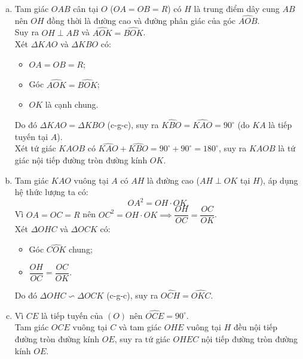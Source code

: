 \begin{bt}
{\begin{center}
\end{center}
\begin{enumerate}[a)]
	\item Tam giác $OAB$ cân tại $O$ ($OA = OB = R$) có $H$ là trung điểm dây cung $AB$ nên $OH$ đồng thời là đường cao và đường phân giác của góc $\widehat{AOB}$.\\
	Suy ra $OH \perp AB$ và $\widehat{AOK} = \widehat{BOK}$.\\
	Xét $\Delta KAO$ và $\Delta KBO$ có:
	\begin{itemize}
		\item $OA = OB = R$;
		\item Góc $\widehat{AOK} = \widehat{BOK}$;
		\item $OK$ là cạnh chung.
	\end{itemize}
	Do đó $\Delta KAO = \Delta KBO$ (c-g-c), suy ra $\widehat{KBO} = \widehat{KAO} = 90^\circ$ (do $KA$ là tiếp tuyến tại $A$).\\
	Xét tứ giác $KAOB$ có $\widehat{KAO} + \widehat{KBO} = 90^\circ + 90^\circ = 180^\circ$, suy ra $KAOB$ là tứ giác nội tiếp đường tròn đường kính $OK$.
	\item Tam giác $KAO$ vuông tại $A$ có $AH$ là đường cao ($AH \perp OK$ tại $H$), áp dụng hệ thức lượng ta có:
	$$OA^2 = OH \cdot OK.$$
	Vì $OA = OC = R$ nên $OC^2 = OH \cdot OK \implies \dfrac{OH}{OC} = \dfrac{OC}{OK}$.\\
	Xét $\Delta OHC$ và $\Delta OCK$ có:
	\begin{itemize}
		\item Góc $\widehat{COK}$ chung;
		\item $\dfrac{OH}{OC} = \dfrac{OC}{OK}$.
	\end{itemize}
	Do đó $\Delta OHC \backsim \Delta OCK$ (c-g-c), suy ra $\widehat{OCH} = \widehat{OKC}$.
	\item Vì $CE$ là tiếp tuyến của $(O)$ nên $\widehat{OCE} = 90^\circ$.\\
	Tam giác $OCE$ vuông tại $C$ và tam giác $OHE$ vuông tại $H$ đều nội tiếp đường tròn đường kính $OE$, suy ra tứ giác $OHEC$ nội tiếp đường tròn đường kính $OE$.\\

\end{enumerate}}
\end{bt}
